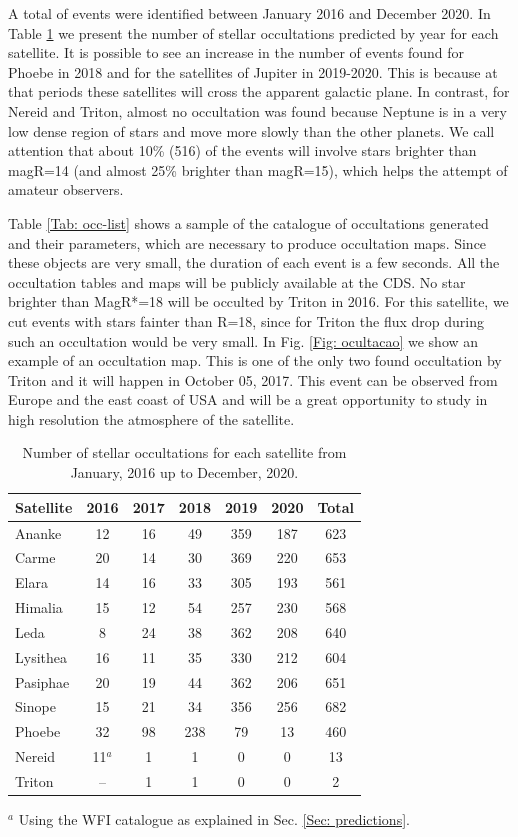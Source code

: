 \documentclass[useAMS,usenatbib]{mn2e}
\begin{document}
A total of \noccs events were identified between January 2016 and December 2020. In Table \ref{Tab: satellite-occultation} we present the number of stellar occultations predicted by year for each satellite. It is possible to see an increase in the number of events found for Phoebe in 2018 and for the satellites of Jupiter in 2019-2020. This is because at that periods these satellites will cross the apparent galactic plane. In contrast, for Nereid and Triton, almost no occultation was found because Neptune is in a very low dense region of stars and move more slowly than the other planets. We call attention that about 10\% (516) of the events will involve stars brighter than magR=14 (and almost 25\% brighter than magR=15), which helps the attempt of amateur observers.

Table \ref{Tab: occ-list} shows a sample of the catalogue of occultations generated and their parameters, which are necessary to produce occultation maps. Since these objects are very small, the duration of each event is a few seconds. All the occultation tables and maps will be publicly available at the CDS. No star brighter than MagR*=18 will be occulted by Triton in 2016. For this satellite, we cut events with stars fainter than R=18, since for Triton the flux drop during such an occultation would be very small. In Fig. \ref{Fig: ocultacao} we show an example of an occultation map. This is one of the only two found occultation by Triton and it will happen in October 05, 2017. This event can be observed from Europe and the east coast of USA and will be a great opportunity to study in high resolution the atmosphere of the satellite.

\begin{table}
\caption{\label{Tab: satellite-occultation} Number of stellar occultations for each satellite from January, 2016 up to December, 2020.}
\begin{centering}
\begin{tabular}{lcccccc}
\hline  \hline
Satellite  & 2016 & 2017 & 2018 & 2019 & 2020 & Total \tabularnewline
\hline
Ananke & 12 & 16 & 49 & 359 & 187 & 623 \tabularnewline
Carme & 20 & 14 & 30 & 369 & 220 & 653 \tabularnewline
Elara & 14 & 16 & 33 & 305 & 193 & 561 \tabularnewline
Himalia & 15 & 12 & 54 & 257 & 230 & 568 \tabularnewline
Leda & 8 & 24 & 38 & 362 & 208 & 640 \tabularnewline
Lysithea & 16 & 11 & 35 & 330 & 212 & 604 \tabularnewline
Pasiphae & 20 & 19 & 44 & 362 & 206 & 651 \tabularnewline
Sinope & 15 & 21 & 34 & 356 & 256 & 682 \tabularnewline
\hdashline
Phoebe & 32 & 98 & 238 & 79 & 13 & 460 \tabularnewline
\hdashline
Nereid & 11$^{a}$ & 1 & 1 & 0 & 0 & 13 \tabularnewline
Triton & -- & 1 & 1 & 0 & 0 & 2 \tabularnewline
\hline
\end{tabular}
\par \end{centering}
$^{a}$ {Using the WFI catalogue as explained in Sec. \ref{Sec: predictions}}.
\end{table}
\end{document}
